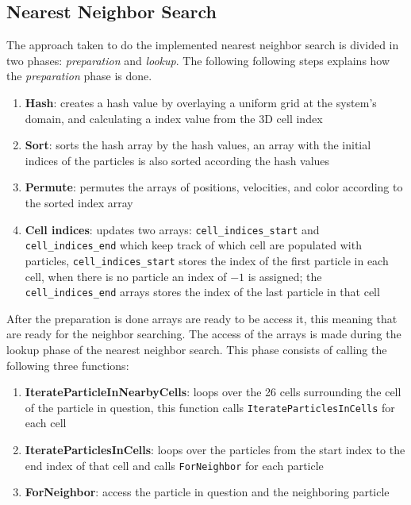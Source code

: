 \subsection{Nearest Neighbor Search}
The approach taken to do the implemented nearest neighbor search is divided in two phases: \textit{preparation} and \textit{lookup}. The following following steps explains how the \textit{preparation} phase is done.

\begin{enumerate}
\item{\textbf{Hash}: creates a hash value by overlaying a uniform grid at the system's domain, and calculating a index value from the 3D cell index}
\item{\textbf{Sort}: sorts the hash array by the hash values, an array with the initial indices of the particles is also sorted according the hash values}
\item{\textbf{Permute}:  permutes the arrays of positions, velocities, and color according to the sorted index array}
\item{\textbf{Cell indices}: updates two arrays: \texttt{cell\_indices\_start} and \texttt{cell\_indices\_end} which keep track of which cell are populated with particles, \texttt{cell\_indices\_start} stores the index of the first particle in each cell, when there is no particle an index of $-1$ is assigned; the \texttt{cell\_indices\_end} arrays stores the index of the last particle in that cell}
\end{enumerate}

After the preparation is done arrays are ready to be access it, this meaning that are ready for the neighbor searching. The access of  the arrays is made during the lookup phase of the nearest neighbor search. This phase consists of calling the following three functions:

\begin{enumerate}
\item{\textbf{IterateParticleInNearbyCells}: loops over the 26 cells surrounding the cell of the particle in question, this function calls \texttt{IterateParticlesInCells} for each cell }
\item{\textbf{IterateParticlesInCells}: loops over the particles from the start index to the end index of that cell and calls \texttt{ForNeighbor} for each particle}
\item{\textbf{ForNeighbor}: access the particle in question and the neighboring particle}
\end{enumerate}

